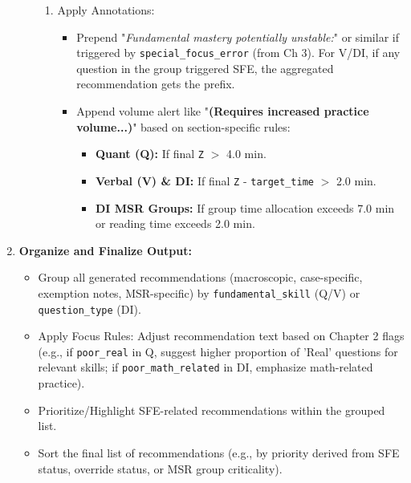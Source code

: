 \documentclass{article}
\begin{document}
\begin{enumerate}
\begin{itemize}
\begin{enumerate}
                \item Apply Annotations:
                    \begin{itemize}
                        \item Prepend "\textit{Fundamental mastery potentially unstable:}" or similar if triggered by \texttt{special\_focus\_error} (from Ch 3). For V/DI, if any question in the group triggered SFE, the aggregated recommendation gets the prefix.
                        \item Append volume alert like "\textbf{(Requires increased practice volume...)}" based on section-specific rules:
                            \begin{itemize}
                                \item \textbf{Quant (Q):} If final \texttt{Z} $>$ 4.0 min.
                                \item \textbf{Verbal (V) \& DI:} If final \texttt{Z} - \texttt{target\_time} $>$ 2.0 min.
                                \item \textbf{DI MSR Groups:} If group time allocation exceeds 7.0 min or reading time exceeds 2.0 min.
                            \end{itemize}
                    \end{itemize}
            \end{enumerate}
    \end{itemize}
    \item \textbf{Organize and Finalize Output:}
    \begin{itemize}
        \item Group all generated recommendations (macroscopic, case-specific, exemption notes, MSR-specific) by \texttt{fundamental\_skill} (Q/V) or \texttt{question\_type} (DI).
        \item Apply Focus Rules: Adjust recommendation text based on Chapter 2 flags (e.g., if \texttt{poor\_real} in Q, suggest higher proportion of 'Real' questions for relevant skills; if \texttt{poor\_math\_related} in DI, emphasize math-related practice).
        \item Prioritize/Highlight SFE-related recommendations within the grouped list.
        \item Sort the final list of recommendations (e.g., by priority derived from SFE status, override status, or MSR group criticality).
    \end{itemize}
\end{enumerate}
\end{document}

